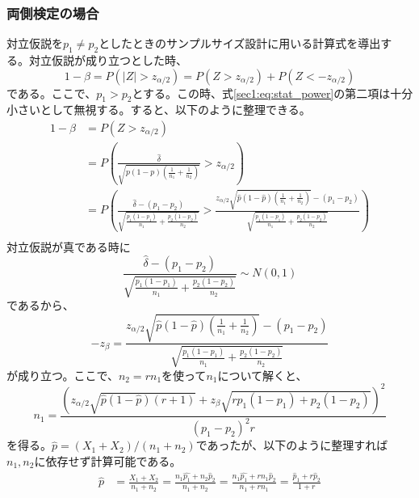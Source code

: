 \subsubsection{両側検定の場合}
対立仮説を$p_{1} \neq p_{2}$としたときのサンプルサイズ設計に用いる計算式を導出する。対立仮説が成り立つとした時、
\begin{equation}
    1 - \beta = P(|Z| > z_{\alpha/2}) = P(Z > z_{\alpha/2}) + P(Z < -z_{\alpha/2}) \label{sec1:eq:stat_power}
\end{equation}
である。ここで、$p_{1} > p_{2}$とする。この時、式\eqref{sec1:eq:stat_power}の第二項は十分小さいとして無視する。すると、以下のように整理できる。
\begin{align}
    1 - \beta & = P(Z > z_{\alpha/2}) \label{sec1:eq:stat_power_simplified}                                                                                                                                                                                                                                                            \\
              & = P\left(\frac{\hat{\delta}}{\sqrt{p(1 - p)\left(\frac{1}{n_{1}} + \frac{1}{n_{2}}\right)}} > z_{\alpha/2}\right)                                                                                                                                                                                                      \\
              & = P\left(\frac{\hat{\delta} - (p_{1} - p_{2})}{\sqrt{\frac{p_{1}(1 - p_{1})}{n_{1}} + \frac{p_{2}(1 - p_{2})}{n_{2}}}} > \frac{z_{\alpha/2}\sqrt{\hat{p}(1 - \hat{p})\left(\frac{1}{n_{1}} + \frac{1}{n_{2}}\right)} - (p_{1} - p_{2})}{\sqrt{\frac{p_{1}(1 - p_{1})}{n_{1}} + \frac{p_{2}(1 - p_{2})}{n_{2}}}}\right) \\
\end{align}
対立仮説が真である時に
\begin{equation}
    \frac{\hat{\delta} - (p_{1} - p_{2})}{\sqrt{\frac{p_{1}(1 - p_{1})}{n_{1}} + \frac{p_{2}(1 - p_{2})}{n_{2}}}} \sim N(0, 1)
\end{equation}
であるから、
\begin{equation}
    -z_{\beta} = \frac{z_{\alpha/2}\sqrt{\hat{p}(1 - \hat{p})\left(\frac{1}{n_{1}} + \frac{1}{n_{2}}\right)} - (p_{1} - p_{2})}{\sqrt{\frac{p_{1}(1 - p_{1})}{n_{1}} + \frac{p_{2}(1 - p_{2})}{n_{2}}}}
\end{equation}
が成り立つ。ここで、$n_{2} = rn_{1}$を使って$n_{1}$について解くと、
\begin{equation}
    n_{1} = \frac{\left(z_{\alpha/2}\sqrt{\hat{p}(1 - \hat{p})(r + 1)} + z_{\beta}\sqrt{rp_{1}(1 - p_{1}) + p_{2}(1 - p_{2})}\right)^{2}}{(p_{1} - p_{2})^{2}r}
\end{equation}
を得る。$\hat{p} = (X_{1} + X_{2})/(n_{1} + n_{2})$であったが、以下のように整理すれば$n_{1}, n_{2}$に依存せず計算可能である。
\begin{align}
    \hat{p} & = \frac{X_{1} + X_{2}}{n_{1} + n_{2}} = \frac{n_{1}\hat{p_{1}} + n_{2}\hat{p}_{2}}{n_{1} + n_{2}} = \frac{n_{1}\hat{p_{1}} + rn_{1}\hat{p}_{2}}{n_{1} + rn_{1}} = \frac{\hat{p}_{1} + r\hat{p}_{2}}{1 + r} \\
\end{align}

